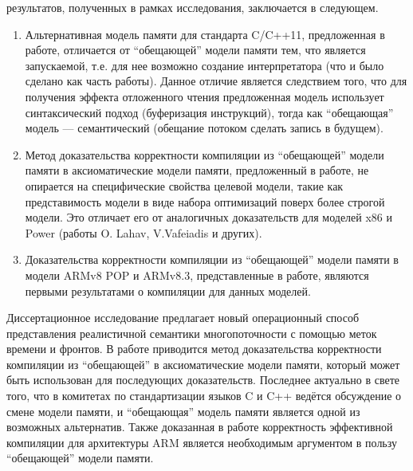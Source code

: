 {\novelty} результатов, полученных в рамках исследования, заключается в следующем.
\begin{enumerate}
  \item Альтернативная модель памяти для стандарта C/C++11, предложенная в работе, отличается от ``обещающей'' модели
  памяти тем, что является запускаемой, т.е. для нее возможно создание интерпретатора (что и было сделано как часть работы).
  Данное отличие является следствием того, что для получения эффекта отложенного чтения предложенная модель использует
  синтаксический подход (буферизация инструкций), тогда как ``обещающая'' модель --- семантический (обещание потоком сделать
  запись в будущем).
  \item Метод доказательства корректности компиляции из ``обещающей'' модели памяти в аксиоматические модели памяти,
        предложенный в работе, не опирается на специфические свойства целевой модели, такие как представимость модели в виде
        набора оптимизаций поверх более строгой модели.
        Это отличает его от аналогичных доказательств для моделей x86 и Power (работы O. Lahav, V.Vafeiadis и других).
  \item Доказательства корректности компиляции из ``обещающей'' модели памяти в модели ARMv8 POP и ARMv8.3, представленные
  в работе, являются первыми результатами о компиляции для данных моделей.
\end{enumerate}

{\influence}
Диссертационное исследование предлагает новый
операционный способ представления реалистичной семантики многопоточности с помощью меток времени и фронтов.
В работе приводится метод доказательства корректности компиляции из ``обещающей'' в аксиоматические модели памяти,
который может быть использован для последующих доказательств. Последнее актуально в свете того, что
в комитетах по стандартизации языков C и C++ ведётся обсуждение о смене модели памяти, и ``обещающая'' модель памяти
является одной из возможных альтернатив. Также доказанная в работе корректность эффективной компиляции для архитектуры
ARM является необходимым аргументом в пользу ``обещающей'' модели памяти.


